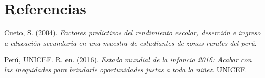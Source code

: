 \documentclass[
]{article}
\newlength{\cslhangindent}
\newenvironment{CSLReferences}[2] %
 {\begin{list}{}{%
  \setlength{\itemindent}{0pt}
  \setlength{\leftmargin}{0pt}
  \setlength{\parsep}{0pt}
  \ifodd #1
   \setlength{\leftmargin}{\cslhangindent}
   \setlength{\itemindent}{-1\cslhangindent}
  \fi
  \setlength{\itemsep}{#2\baselineskip}}}
 {\end{list}}
\begin{document}
\newpage

\section*{Referencias}\label{referencias}

\label{refs}
\begin{CSLReferences}{1}{0}
Cueto, S. (2004). \emph{Factores predictivos del rendimiento escolar,
deserci{ó}n e ingreso a educaci{ó}n secundaria en una muestra de
estudiantes de zonas rurales del per{ú}}.

Perú, UNICEF. R. en. (2016). \emph{Estado mundial de la infancia 2016:
Acabar con las inequidades para brindarle oportunidades justas a toda la
niñez}. UNICEF.

\end{CSLReferences}
\end{document}
